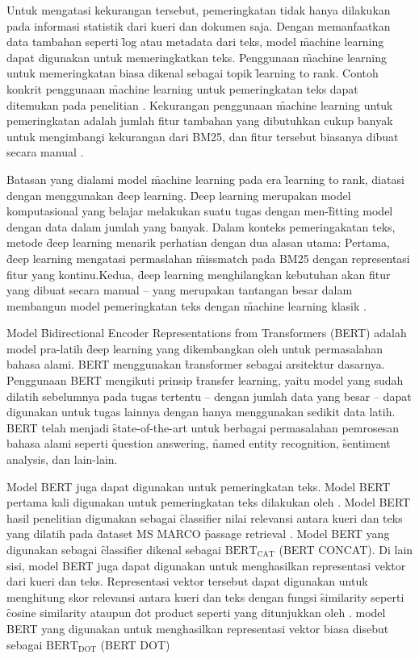 Untuk mengatasi kekurangan tersebut, pemeringkatan tidak hanya dilakukan pada informasi statistik dari kueri dan dokumen saja. Dengan memanfaatkan data tambahan seperti \f{log} atau metadata dari teks, model \f{machine learning} dapat digunakan untuk memeringkatkan teks. Penggunaan \f{machine learning} untuk memeringkatan biasa dikenal sebagai topik \f{learning to rank}. Contoh konkrit penggunaan \f{machine learning} untuk pemeringkatan teks dapat ditemukan pada penelitian \cite{letorhendri}. Kekurangan penggunaan \f{machine learning} untuk pemeringkatan adalah jumlah fitur tambahan yang dibutuhkan cukup banyak untuk mengimbangi kekurangan dari BM25, dan fitur tersebut biasanya dibuat secara manual \citep{textrankingsurvey}.

Batasan yang dialami model \f{machine learning} pada era \f{learning to rank}, diatasi dengan menggunakan \f{deep learning}. \f{Deep learning} merupakan model komputasional yang belajar melakukan suatu tugas dengan men-\f{fitting} model dengan data dalam jumlah yang banyak. Dalam konteks pemeringakatan teks, metode \f{deep learning} menarik perhatian dengan dua alasan utama: Pertama, \f{deep learning} mengatasi permaslahan \f{missmatch} pada BM25 dengan representasi  fitur yang kontinu.Kedua, \f{deep learning} menghilangkan kebutuhan akan fitur yang dibuat secara manual -- yang merupakan tantangan besar dalam membangun model pemeringkatan teks dengan \f{machine learning} klasik \citep{irlecture}.

Model \f{Bidirectional Encoder Representations from Transformers} (BERT) adalah model pra-latih \f{deep learning} yang dikembangkan oleh \cite{bertori} untuk permasalahan bahasa alami. BERT menggunakan \f{transformer} \citep{transformerori} sebagai arsitektur dasarnya. Penggunaan BERT mengikuti prinsip \f{transfer learning}, yaitu model yang sudah dilatih sebelumnya pada tugas tertentu -- dengan jumlah data yang besar -- dapat digunakan untuk tugas lainnya dengan hanya menggunakan sedikit data latih. BERT telah menjadi \f{state-of-the-art} untuk berbagai permasalahan pemrosesan bahasa alami seperti \f{question answering}, \f{named entity recognition}, \f{sentiment analysis}, dan lain-lain.

Model BERT juga dapat digunakan untuk pemeringkatan teks. Model BERT pertama kali digunakan untuk pemeringkatan teks dilakukan oleh \cite{firstRerankingBert}. Model BERT hasil penelitian \cite{firstRerankingBert} digunakan sebagai \f{classifier} nilai relevansi antara kueri dan teks yang dilatih pada \f{dataset} MS MARCO \f{passage retrieval} \citep{msmarco}. Model BERT yang digunakan sebagai \f{classifier} dikenal sebagai $\text{BERT}_{\text{CAT}}$ (BERT CONCAT). Di lain sisi, model BERT juga dapat digunakan untuk menghasilkan representasi vektor dari kueri dan teks. Representasi vektor tersebut dapat digunakan untuk menghitung skor relevansi antara kueri dan teks dengan fungsi \f{similarity} seperti \f{cosine similarity} ataupun \f{dot product} seperti yang ditunjukkan oleh \cite{dprmeta,reimers-2019-sentence-bert}. model BERT yang digunakan untuk menghasilkan representasi vektor biasa disebut sebagai $\text{BERT}_{\text{DOT}}$ (BERT DOT) 

